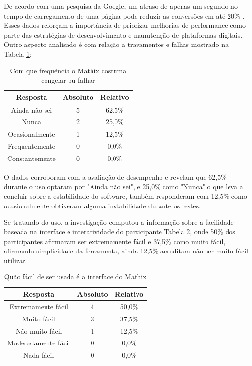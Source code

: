De acordo com uma pesquisa da Google, um atraso de apenas um segundo no tempo de carregamento de uma página pode reduzir as conversões em até 20\% \cite{google2018speed}. Esses dados reforçam a importância de priorizar melhorias de performance como parte das estratégias de desenvolvimento e manutenção de plataformas digitais. Outro aspecto analisado é com relação a travamentos e falhas mostrado na Tabela \ref{tab:ui-3}:



\begin{table}[h!]
    \centering
    \caption{Com que frequência o Mathix costuma congelar ou falhar}
    \begin{tabular}{c|c|c}
        \textbf{Resposta} &	\textbf{Absoluto} & \textbf{Relativo} \\
        \hline
        Ainda não sei & 5 & 62,5\% \\
        \hline
        Nunca & 2 & 25,0\% \\
        \hline
        Ocasionalmente & 1 & 12,5\% \\
        \hline
        Frequentemente & 0 & 0,0\% \\
        \hline
        Constantemente & 0 & 0,0\% \\
    \end{tabular}
    \label{tab:ui-3}
\end{table}

O dados corroboram com a avaliação de desempenho e revelam que 62,5\% durante o uso optaram por "Ainda não sei", e 25,0\% como "Nunca" o que leva a concluir sobre a estabilidade do software, também responderam com 12,5\% como ocasionalmente obtiveram alguma instabilidade durante os testes.

Se tratando do uso, a investigação computou a informação sobre a facilidade baseada na interface e interatividade do participante Tabela \ref{tab:ui-4}, onde 50\% dos participantes afirmaram ser extremamente fácil e 37,5\% como muito fácil, afirmando simplicidade da ferramenta, ainda 12,5\% acreditam não ser muito fácil utilizar.


\begin{table}[h!]
    \centering
    \caption{Quão fácil de ser usada é a interface do Mathix}
    \begin{tabular}{c|c|c}
        \textbf{Resposta} &	\textbf{Absoluto} & \textbf{Relativo} \\
        \hline
        Extremamente fácil & 4 & 50,0\% \\
        \hline
        Muito fácil & 3 & 37,5\% \\
        \hline
        Não muito fácil & 1 & 12,5\% \\
        \hline
        Moderadamente fácil & 0 & 0,0\% \\
        \hline
        Nada fácil & 0 & 0,0\% \\
    \end{tabular}
    \label{tab:ui-4}
\end{table}

